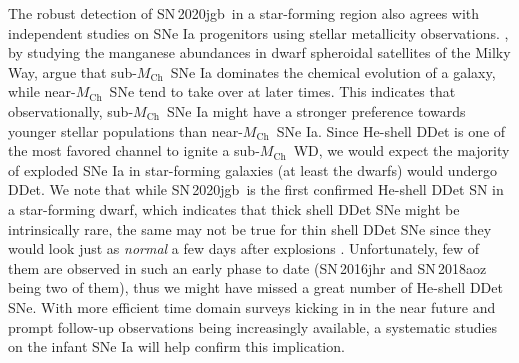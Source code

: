 \documentclass[twocolumn]{aastex631}
\newcommand{\sn}{SN\,2020jgb}
\newcommand{\Mch}{$M_\mathrm{Ch}$}
\begin{document}
The robust detection of \sn\ in a star-forming region also agrees with independent studies on SNe Ia progenitors using stellar metallicity observations. \citet{de_los_reyes_manganese_2020}, by studying the manganese abundances in dwarf spheroidal satellites of the Milky Way, argue that sub-\Mch\ SNe Ia dominates the chemical evolution of a galaxy, while near-\Mch\ SNe tend to take over at later times. This indicates that observationally, sub-\Mch\ SNe Ia might have a stronger preference towards younger stellar populations than near-\Mch\ SNe Ia. Since He-shell DDet is one of the most favored channel to ignite a sub-\Mch\ WD, we would expect the majority of exploded SNe Ia in star-forming galaxies (at least the dwarfs) would undergo DDet. We note that while \sn\ is the first confirmed He-shell DDet SN in a star-forming dwarf, which indicates that thick shell DDet SNe might be intrinsically rare, the same may not be true for thin shell DDet SNe since they would look just as {\it normal} a few days after explosions \citep{Ni_2022}. Unfortunately, few of them are observed in such an early phase to date (SN\,2016jhr and SN\,2018aoz being two of them), thus we might have missed a great number of He-shell DDet SNe. With more efficient time domain surveys kicking in in the near future and prompt follow-up observations being increasingly available, a systematic studies on the infant SNe Ia will help confirm this implication.
\end{document}

